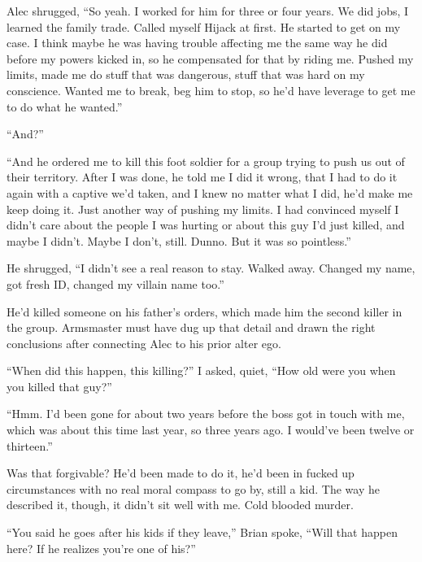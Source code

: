 Alec shrugged, ``So yeah.  I worked for him for three or four years.  We did jobs, I learned the family trade.  Called myself Hijack at first.  He started to get on my case.  I think maybe he was having trouble affecting me the same way he did before my powers kicked in, so he compensated for that by riding me.  Pushed my limits, made me do stuff that was dangerous, stuff that was hard on my conscience.  Wanted me to break, beg him to stop, so he'd have leverage to get me to do what he wanted.''



``And?''



``And he ordered me to kill this foot soldier for a group trying to push us out of their territory.  After I was done, he told me I did it wrong, that I had to do it again with a captive we'd taken, and I knew no matter what I did, he'd make me keep doing it.  Just another way of pushing my limits.  I had convinced myself I didn't care about the people I was hurting or about this guy I'd just killed, and maybe I didn't.  Maybe I don't, still.  Dunno.  But it was so pointless.''



He shrugged, ``I didn't see a real reason to stay.  Walked away.  Changed my name, got fresh ID, changed my villain name too.''



He'd killed someone on his father's orders, which made him the second killer in the group. Armsmaster must have dug up that detail and drawn the right conclusions after connecting Alec to his prior alter ego.



``When did this happen, this killing?'' I asked, quiet, ``How old were you when you killed that guy?''



``Hmm.  I'd been gone for about two years before the boss got in touch with me, which was about this time last year, so three years ago.  I would've been twelve or thirteen.''



Was that forgivable?  He'd been made to do it, he'd been in fucked up circumstances with no real moral compass to go by, still a kid.  The way he described it, though, it didn't sit well with me.  Cold blooded murder.



``You said he goes after his kids if they leave,'' Brian spoke, ``Will that happen here?  If he realizes you're one of his?''



